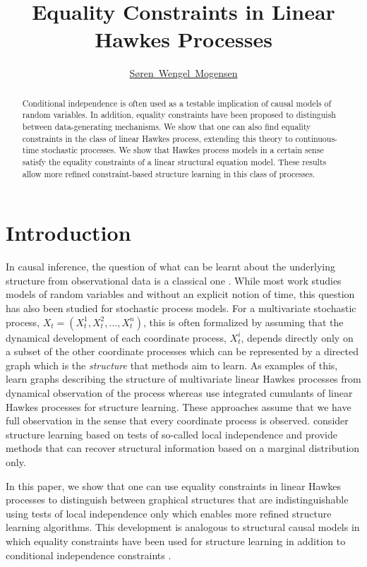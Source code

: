 \documentclass[accepted]{uai2021} %
\title{Equality Constraints in Linear Hawkes 
Processes}
\author[1]{\href{mailto: Søren Wengel Mogensen 
<soren.wengel_mogensen@control.lth.se>}{Søren~Wengel~Mogensen}{}}
\affil[1]{%
    Department of Automatic Control\\
    Lund University\\
    Sweden
}
\begin{document}
\maketitle

\begin{abstract}
Conditional independence is often used as a testable 
implication of causal models of random variables. In addition, equality 
constraints have been proposed to distinguish between data-generating 
mechanisms. We show that one 
can also find equality constraints in the class of linear Hawkes process, 
extending this theory to continuous-time stochastic processes. We 
show that Hawkes process models in a certain sense satisfy the equality 
constraints 
of a linear structural equation model. These results
allow more refined constraint-based structure learning in this class of 
processes.
\end{abstract}


\section{Introduction}\label{sec:intro}

In causal inference, the question of what can be learnt about the underlying 
structure from observational data is a classical one 
\citep{spirtes1993,pearl2009}. While most work 
studies models of random variables and without an explicit notion of time, this 
question has also been 
studied for stochastic process models. For a multivariate stochastic 
process, $X_t = (X_t^1, X_t^2, \ldots, X_t^n)$, this is often formalized by 
assuming that the dynamical development of each coordinate process, $X_t^i$,   
depends directly only on a subset of the other coordinate processes which can 
be 
represented by a directed graph which is the \emph{structure} that methods 
aim to learn. As examples of this, \cite{eichlerHawkes2017, xu2016} learn
graphs describing the structure of multivariate linear Hawkes processes from 
dynamical observation of the process whereas 
\cite{achab2017} use integrated cumulants of 
linear Hawkes processes for structure learning. 
These approaches assume that we have full observation in the sense that every 
coordinate 
process is observed. \cite{meek2014, mogensenUAI2018, mogensenUAI2020} consider 
structure learning based on tests of so-called local independence and provide 
methods 
that can recover structural information based on a marginal distribution only. 

In this paper, we show that one can 
use equality 
constraints in linear Hawkes processes to distinguish between graphical 
structures that 
are indistinguishable using tests of local independence only which enables more 
refined structure learning algorithms. This development 
is analogous to structural causal models in which equality constraints have 
been used for structure learning in addition to conditional independence 
constraints 
\citep{robins1986,vermaEquiAndSynthesis,robins1999,tian2002,shpitser2014,richardson2017}.
\end{document}
